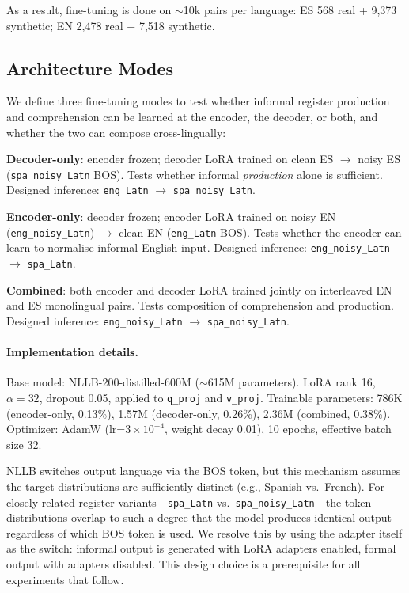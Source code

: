 \documentclass[11pt]{article}
\begin{document}
As a result, fine-tuning is done on $\sim$10k pairs per language: ES 568 real + 9,373 synthetic; EN 2,478 real + 7,518 synthetic.

\subsection{Architecture Modes}
\label{ss:arch}

We define three fine-tuning modes to test whether informal register production and comprehension can be learned at the encoder, the decoder, or both, and whether
the two can compose cross-lingually:

\textbf{Decoder-only}: encoder frozen; decoder LoRA trained on clean ES $\rightarrow$
noisy ES (\texttt{spa\_noisy\_Latn} BOS). Tests whether informal
\emph{production} alone is sufficient. Designed inference: \texttt{eng\_Latn}
$\rightarrow$ \texttt{spa\_noisy\_Latn}.

\textbf{Encoder-only}: decoder frozen; encoder LoRA trained on noisy EN
(\texttt{eng\_noisy\_Latn}) $\rightarrow$ clean EN (\texttt{eng\_Latn} BOS).
Tests whether the encoder can learn
to normalise informal English input. Designed
inference: \texttt{eng\_noisy\_Latn} $\rightarrow$ \texttt{spa\_Latn}.

\textbf{Combined}: both encoder and decoder LoRA trained jointly on interleaved
EN and ES monolingual pairs. Tests composition of comprehension and production.
Designed inference: \texttt{eng\_noisy\_Latn} $\rightarrow$ \texttt{spa\_noisy\_Latn}.

\paragraph{Implementation details.}
Base model: NLLB-200-distilled-600M ($\sim$615M parameters). LoRA rank 16,
$\alpha{=}32$, dropout 0.05, applied to \texttt{q\_proj} and \texttt{v\_proj}.
Trainable parameters: 786K (encoder-only, 0.13\%), 1.57M (decoder-only, 0.26\%),
2.36M (combined, 0.38\%). Optimizer: AdamW (lr=$3 \times 10^{-4}$, weight decay
0.01), 10 epochs, effective batch size 32.

NLLB switches output language via the BOS token, but this mechanism assumes the
target distributions are sufficiently distinct (e.g., Spanish vs.\ French).
For closely related register variants---\texttt{spa\_Latn}
vs.\ \texttt{spa\_noisy\_Latn}---the token distributions
overlap to such a degree that the model produces identical
output regardless of which BOS token is used. We resolve this by using the adapter itself as the switch: informal output is generated with LoRA adapters enabled, formal output with adapters disabled. This design choice is a prerequisite for all experiments
that follow.
\end{document}
